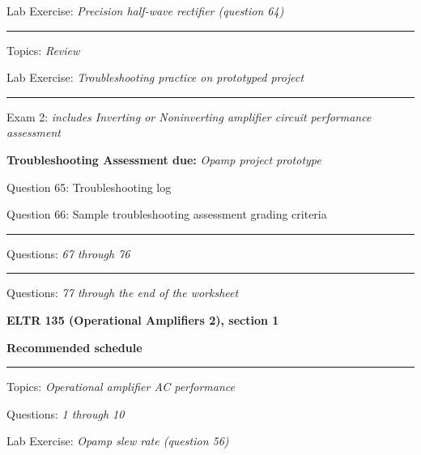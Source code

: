 \hskip 10pt Lab Exercise: {\it Precision half-wave rectifier (question 64)}
 
\vskip 10pt
\hrule \vskip 5pt
\noindent
{}

\hskip 10pt Topics: {\it Review}
 
\hskip 10pt Lab Exercise: {\it Troubleshooting practice on prototyped project}
 
\vskip 10pt
\hrule \vskip 5pt
\noindent
{}

\hskip 10pt Exam 2: {\it includes Inverting or Noninverting amplifier circuit performance assessment}
 
\hskip 10pt {\bf Troubleshooting Assessment due:} {\it Opamp project prototype}
 
\hskip 10pt Question 65: Troubleshooting log
 
\hskip 10pt Question 66: Sample troubleshooting assessment grading criteria
 
\vskip 10pt
\hrule \vskip 5pt
\noindent
{}

\hskip 10pt Questions: {\it 67 through 76}
 
\vskip 10pt
\hrule \vskip 5pt
\noindent
{}

\hskip 10pt Questions: {\it 77 through the end of the worksheet}
 
\vskip 10pt











\vfil \eject

\centerline{\bf ELTR 135 (Operational Amplifiers 2), section 1} \bigskip 
 
\vskip 10pt

\noindent
{\bf Recommended schedule}

\vskip 5pt

\hrule \vskip 5pt
\noindent
{}

\hskip 10pt Topics: {\it Operational amplifier AC performance}
 
\hskip 10pt Questions: {\it 1 through 10}
 
\hskip 10pt Lab Exercise: {\it Opamp slew rate (question 56)}
 

